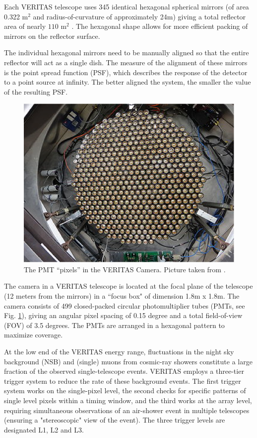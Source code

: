 \documentclass[main.tex]{subfiles}
\begin{document}
Each VERITAS telescope uses 345 identical hexagonal spherical mirrors (of area 0.322 m$^2$ and radius-of-curvature of approximately 24m) giving a total reflector area of nearly $110$ m$^2$ \cite{veritas_web}. The hexagonal shape allows for more efficient packing of mirrors on the reflector surface.\par
The individual hexagonal mirrors need to be manually aligned so that the entire reflector will act as a single dish. The measure of the alignment of these mirrors is the point spread function (PSF), which describes the response of the detector to a point source at infinity. The better aligned the system, the smaller the value of the resulting PSF.\par
\begin{figure}[htbp]
  \centering
  \includegraphics[width=0.58\linewidth]{images/Camera_PMT}
  \caption[PMTs in the VERITAS camera.]{The PMT ``pixels'' in the VERITAS Camera. Picture taken from \cite{Kieda:2013wom}.}
  \label{fig:VERITAS_Cam}
\end{figure}
The camera in a VERITAS telescope is located at the focal plane of the telescope (12 meters from the mirrors) in a ``focus box" of dimension 1.8m x 1.8m. The camera consists of 499 closed-packed circular photomultiplier tubes (PMTs, see Fig. \ref{fig:VERITAS_Cam}), giving an angular pixel spacing of 0.15 degree and a total field-of-view (FOV) of 3.5 degrees. The PMTs are arranged in a hexagonal pattern to maximize coverage.\par

At the low end of the VERITAS energy range, fluctuations in the night sky background (NSB) and (single) muons from cosmic-ray showers constitute a large fraction of the observed single-telescope events. VERITAS employs a three-tier trigger system to reduce the rate of these background events. The first trigger system works on the single-pixel level, the second checks for specific patterns of single level pixels within a timing window, and the third works at the array level, requiring simultaneous observations of an air-shower event in multiple telescopes (ensuring a "stereoscopic" view of the event). The three trigger levels are designated L1, L2 and L3.\par
\end{document}
